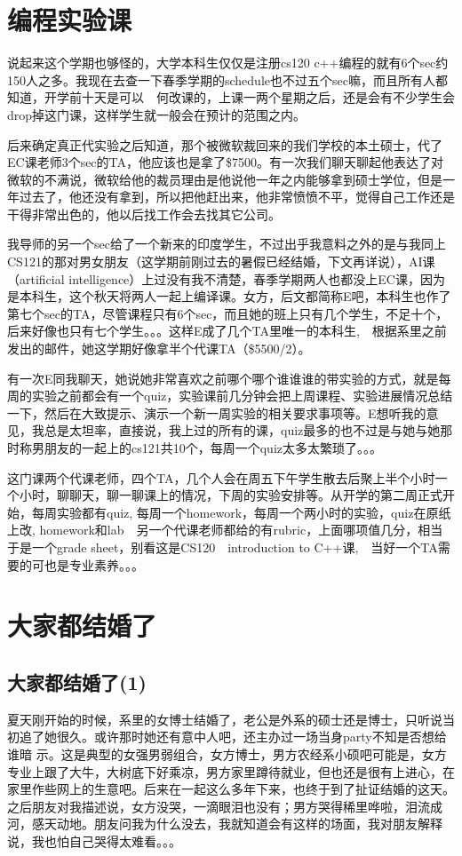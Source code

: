 \documentclass[12pt]{book}
\begin{document}
\chapter{编程实验课}
\label{sec-10}
说起来这个学期也够怪的，大学本科生仅仅是注册cs120 c++编程的就有6个sec约150人之多。我现在去查一下春季学期的schedule也不过五个sec嘛，而且所有人都知道，开学前十天是可以　何改课的，上课一两个星期之后，还是会有不少学生会drop掉这门课，这样学生就一般会在预计的范围之内。

后来确定真正代实验之后知道，那个被微软裁回来的我们学校的本土硕士，代了EC课老师3个sec的TA，他应该也是拿了\$7500。有一次我们聊天聊起他表达了对微软的不满说，微软给他的裁员理由是他说他一年之内能够拿到硕士学位，但是一年过去了，他还没有拿到，所以把他赶出来，他非常愤愤不平，觉得自己工作还是干得非常出色的，他以后找工作会去找其它公司。

我导师的另一个sec给了一个新来的印度学生，不过出乎我意料之外的是与我同上CS121的那对男女朋友（这学期前刚过去的暑假已经结婚，下文再详说），AI课（artificial intelligence）上过没有我不清楚，春季学期两人也都没上EC课，因为是本科生，这个秋天将两人一起上编译课。女方，后文都简称E吧，本科生也作了第七个sec的TA，尽管课程只有6个sec，而且她的班上只有几个学生，不足十个，后来好像也只有七个学生。。。这样E成了几个TA里唯一的本科生,　根据系里之前发出的邮件，她这学期好像拿半个代课TA（\$5500/2）。

有一次E同我聊天，她说她非常喜欢之前哪个哪个谁谁谁的带实验的方式，就是每周的实验之前都会有一个quiz，实验课前几分钟会把上周课程、实验进展情况总结一下，然后在大致提示、演示一个新一周实验的相关要求事项等。E想听我的意见，我总是太坦率，直接说，我上过的所有的课，quiz最多的也不过是与她与她那时称男朋友的一起上的cs121共10个，每周一个quiz太多太繁琐了。。。

这门课两个代课老师，四个TA，几个人会在周五下午学生散去后聚上半个小时一个小时，聊聊天，聊一聊课上的情况，下周的实验安排等。从开学的第二周正式开始，每周实验都有quiz, 每周一个homework，每周一个两小时的实验，quiz在原纸上改, homework和lab　另一个代课老师都给的有rubric，上面哪项值几分，相当于是一个grade sheet，别看这是CS120　introduction to C++课,　当好一个TA需要的可也是专业素养。。。　 

\chapter{大家都结婚了}
\label{sec-11}

\section{大家都结婚了(1)}
\label{sec-11-1}
夏天刚开始的时候，系里的女博士结婚了，老公是外系的硕士还是博士，只听说当初追了她很久。或许那时她还有意中人吧，还主办过一场当身party不知是否想给谁暗
示。这是典型的女强男弱组合，女方博士，男方农经系小硕吧可能是，女方专业上跟了大牛，大树底下好乘凉，男方家里蹲待就业，但也还是很有上进心，在家里作些网上的生意吧。后来在一起这么多年下来，也终于到了扯证结婚的这天。之后朋友对我描述说，女方没哭，一滴眼泪也没有；男方哭得稀里哗啦，泪流成河，感天动地。朋友问我为什么没去，我就知道会有这样的场面，我对朋友解释说，我也怕自己哭得太难看。。。
\end{document}
